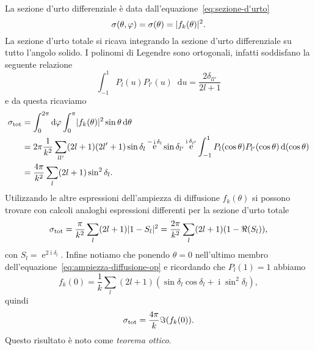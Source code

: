 \documentclass[a4paper,fleqn,twoside,12pt]{article}
\renewcommand{\phi}{\varphi}
\newcommand*{\dd}{\mathop{}\!\mathrm{d}} %
\DeclareMathOperator{\e}{\mathrm{e}} %
\DeclareMathOperator{\uimm}{\mathrm{i}} %
\DeclarePairedDelimiter{\abs}{\lvert}{\rvert}
\begin{document}
La sezione d'urto differenziale è data dall'equazione~\eqref{eq:sezione-d'urto}
\begin{equation}
  \sigma(\theta,\phi) = \sigma(\theta) = \abs{f_{k}(\theta)}^{2}.
\end{equation}
La sezione d'urto totale si ricava integrando la sezione d'urto differenziale su
tutto l'angolo solido.  I polinomi di Legendre sono ortogonali, infatti
soddisfano la seguente relazione
\begin{equation}
  \int_{-1}^{1}P_{l}(u)P_{l'}(u)\dd u = \frac{2\delta_{ll'}}{2l+1}
\end{equation}
e da questa ricaviamo
\begin{equation}
  \label{eq:serie-sfasamenti}
  \begin{split}
    \sigma_{\textup{tot}} &= \int_{0}^{2\pi}\dd \phi \int_{0}^{\pi}
    \abs{f_{k}(\theta)}^{2} \sin\theta \dd\theta \\
    &= 2\pi \frac{1}{k^{2}} \sum_{ll'}(2l+1)(2l'+1) \sin\delta_{l} \e^{-\uimm
      \delta_{l}} \sin\delta_{l'}\e^{\uimm \delta_{l'}}
    \int_{-1}^{1}P_{l}(\cos\theta)P_{l'}(\cos\theta) \dd(\cos\theta) \\
    &= \frac{4\pi}{k^{2}} \sum_{l}(2l+1)\sin^{2}\delta_{l}.
  \end{split}
\end{equation}
Utilizzando le altre espressioni dell'ampiezza di diffusione $f_{k}(\theta)$ si
possono trovare con calcoli analoghi espressioni differenti per la sezione
d'urto totale
\begin{equation}
  \sigma_{\textup{tot}} = \frac{\pi}{k^{2}} \sum_{l}(2l+1)\abs{1 - S_{l}}^{2} =
  \frac{2\pi}{k^{2}} \sum_{l}(2l+1)(1-\Re(S_{l})),
\end{equation}
con $S_{l} = \e^{2\uimm\delta_{l}}$.  Infine notiamo che ponendo $\theta = 0$
nell'ultimo membro dell'equazione~\eqref{eq:ampiezza-diffusione-op} e ricordando
che $P_{l}(1) = 1$ abbiamo
\begin{equation}
  f_{k}(0) = \frac{1}{k} \sum_{l}(2l+1)(\sin\delta_{l}\cos\delta_{l} + \uimm
  \sin^{2}\delta_{l}),
\end{equation}
quindi
\begin{equation}
  \sigma_{\textup{tot}} = \frac{4\pi}{k} \Im(f_{k}(0)).
\end{equation}
Questo risultato è noto come \emph{teorema ottico}.
\end{document}
